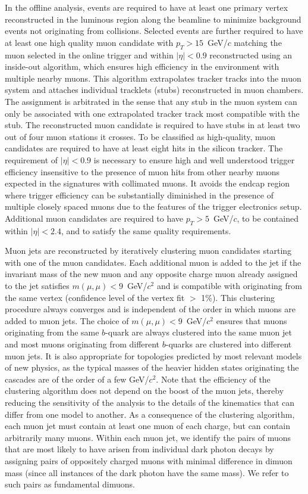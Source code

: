 In the offline analysis, events are required to have at least one primary vertex 
reconstructed in the  luminous region along the beamline to minimize background events not originating 
from collisions. Selected events are 
further required to have at least one high quality muon candidate with $p_T>15$~GeV/$c$ 
matching the muon selected in the online trigger and within $|\eta|<0.9$ reconstructed using 
an inside-out algorithm, which ensures high efficiency in the environment with multiple nearby muons. 
This algorithm extrapolates tracker tracks into the muon system and attaches individual tracklets (stubs) 
reconstructed in muon chambers. The assignment is arbitrated in the sense that any stub in the muon 
system can only be associated with one extrapolated tracker track most compatible with the stub. The 
reconstructed muon candidate is required to have stubs in at least two out of four muon stations it crosses. To 
be classified as high-quality, muon candidates are required to have at least eight hits in the silicon tracker. The 
requirement of $|\eta|<0.9$ is necessary to ensure high and well understood trigger 
efficiency insensitive to the presence of muon hits from other nearby muons
expected in the signatures with collimated muons. It avoids the endcap region where trigger 
efficiency can be substantially diminished in the presence of multiple closely spaced muons due to the features of 
the trigger electronics setup. Additional muon candidates are required to have $p_T>5$~GeV/$c$, to be contained 
within $|\eta|<2.4$, and to satisfy the same quality requirements.

Muon jets are reconstructed by iteratively clustering muon candidates starting with one of the muon
candidates. Each additional muon is added to the jet if the invariant mass of the new muon and any
opposite charge muon already assigned to the jet satisfies $m(\mu,\mu)<9$~GeV/$c^2$ and is
compatible with originating from the same vertex (confidence level of the vertex fit $>$ 1\%). This clustering procedure always converges and is 
independent of the order in which muons are added to muon jets. The choice of $m(\mu,\mu)<9$~GeV/$c^2$ ensures that muons originating from the same $b$-quark are always clustered into the same muon jet and most muons originating from different $b$-quarks are clustered into different muon jets.  It is also appropriate 
for topologies predicted by most relevant models of new physics, as the typical masses of the heavier 
hidden states originating the cascades are of the order of a few GeV/$c^2$. Note that the efficiency of the 
clustering algorithm does not depend on the boost of the muon jets, thereby reducing the sensitivity of the analysis 
to the details of the kinematics that can differ from one model to another. As a consequence of the clustering algorithm, each muon jet must contain at least one muon of each charge, but can contain arbitrarily many muons. 
Within each muon jet, we identify the pairs of muons that are most likely to have arisen from individual dark photon decays by assigning pairs of oppositely charged muons with minimal difference in dimuon mass (since all instances of the dark photon have the same mass).  We refer to such pairs as fundamental dimuons.

